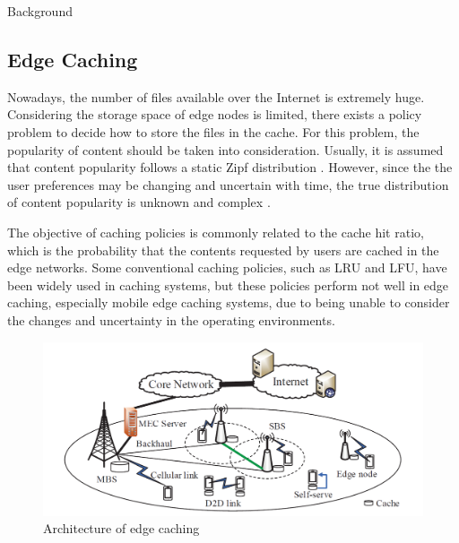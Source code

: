 \documentclass{article}
\begin{document}
\begin{section}{Background}
    \label{sec:background}
    \subsection{Edge Caching}
    Nowadays, the number of files available over the Internet is extremely huge. Considering the storage space of edge nodes is limited, there exists a policy problem to decide how to store the files in the cache. For this problem, the popularity of content should be taken into consideration. Usually, it is assumed that content popularity follows a static Zipf distribution \cite{7524380}. However, since the the user preferences may be changing and uncertain with time, the true distribution of content popularity is unknown and complex \cite{7524790}.
    
    The objective of caching policies is commonly related to the cache hit ratio, which is the probability that the contents requested by users are cached in the edge networks. Some conventional caching policies, such as LRU and LFU, have been widely used in caching systems, but these policies perform not well in edge caching, especially mobile edge caching systems, due to being unable to consider the changes and uncertainty in the operating environments.
    
    \begin{figure}[h!]
        \centering
        \includegraphics[width=0.8\linewidth]{images/cache.png}
        \caption{Architecture of edge caching \cite{MEC}}
        \label{fig:network}
    \end{figure}
    

\end{section}
\end{document}
